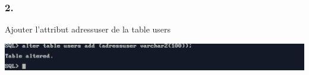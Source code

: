 \subsubsection*{2.}
Ajouter l'attribut adressuser de la table users 



\begin{center}
    \includegraphics[width=\textwidth]{ScreenShot/Partie2/addCol.png}
\end{center}


